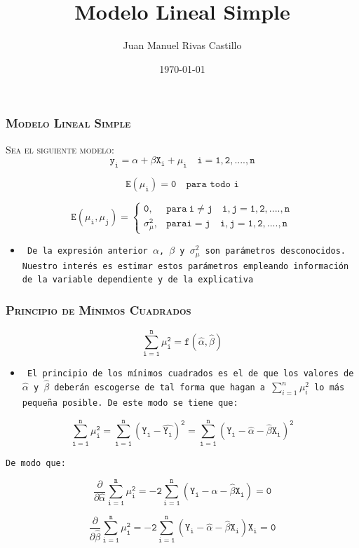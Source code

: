 \documentclass[16.5pt]{beamer}
\title{Modelo Lineal Simple}
\author{Juan Manuel Rivas Castillo}
\institute{USMP}
\date{\today}
\begin{document}
\maketitle 

{
\begin{frame}
\frametitle{\textsc{Modelo Lineal Simple}}
\hspace*{-5mm}
\vspace*{-5mm} 
\textsc{Sea el siguiente modelo:} \\
\vspace{0.3cm}
$$\mathtt{y_i= \alpha + \beta X_i + \mu_i  \quad     i = 1,2,....,n}$$

$$\mathtt{E(\mu_i)=0 \quad \textrm{para todo i} }$$

 $$
\mathtt{E(\mu_i,\mu_j)=
    \begin{cases}
      0, & \text{para}\ i\neq j \quad i,j=1,2,....,n \\
      \sigma^2_{\mu}, & \text{para} i = j  \quad i,j=1,2,....,n
    \end{cases}
}
$$

\vspace{0.3cm}
\begin{itemize}
\item \texttt{ De la expresión anterior $\alpha$, $\beta$ y $ \sigma^2_{\mu}$ son parámetros desconocidos. Nuestro interés es estimar estos parámetros empleando información de la {\color{blue}variable dependiente y de la explicativa}}
\end{itemize}
\end{frame}
}

{
\begin{frame}
\frametitle{\textsc{Principio de Mínimos Cuadrados}}
\hspace*{-5mm}
\vspace*{-5mm} 

$$\mathtt{\sum_{i=1}^n \mu^2_i =f(\hat{\alpha},\hat{\beta})}$$
\begin{itemize}
\item \texttt{ El principio de los mínimos cuadrados es el de que los valores de $\hat{\alpha}$ y $\hat{\beta}$ deberán escogerse de tal forma que hagan a $\sum_{i=1}^n \mu^2_i $ lo más pequeña posible. De este modo se tiene que:}
\end{itemize}
$$\mathtt{\sum_{i=1}^n \mu^2_i = \sum_{i=1}^n(Y_i -\hat{Y_i})^2 = \sum_{i=1}^n (Y_i - \hat{\alpha} -\hat{ \beta} X_i)^2}$$

\texttt{De modo que:}

$$\mathtt{\frac{\partial }{\partial \hat{\alpha }}\sum_{i=1}^n \mu^2_i  = -2 \sum_{i=1}^n (Y_i - \hat{\alpha} -\hat{ \beta} X_i)=0}$$

$$\mathtt{\frac{\partial }{\partial \hat{\beta }}\sum_{i=1}^n \mu^2_i  = -2 \sum_{i=1}^n (Y_i - \hat{\alpha} -\hat{ \beta} X_i)X_i=0}$$

\end{frame}
}
\end{document}
